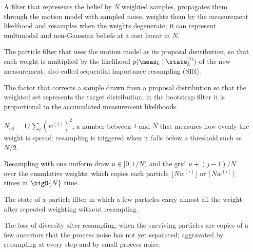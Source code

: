 \item[Particle filter] A filter that represents the belief by $N$ weighted samples, propagates them through the motion model with sampled noise, weights them by the measurement likelihood and resamples when the weights degenerate; it can represent multimodal and non-Gaussian beliefs at a cost linear in $N$.
\item[Bootstrap filter] The particle filter that uses the motion model as its proposal distribution, so that each weight is multiplied by the likelihood $p(\meas_k \mid \state_k^{(i)})$ of the new measurement; also called sequential importance resampling (SIR).
\item[Importance weight] The factor that corrects a sample drawn from a proposal distribution so that the weighted set represents the target distribution; in the bootstrap filter it is proportional to the accumulated measurement likelihoods.
\item[Effective sample size] $N_{\mathrm{eff}} = 1/\sum_i (w^{(i)})^2$, a number between $1$ and $N$ that measures how evenly the weight is spread; resampling is triggered when it falls below a threshold such as $N/2$.
\item[Systematic resampling] Resampling with one uniform draw $u \in [0, 1/N)$ and the grid $u + (j-1)/N$ over the cumulative weights, which copies each particle $\lfloor Nw^{(i)}\rfloor$ or $\lceil Nw^{(i)}\rceil$ times in $\bigO{N}$ time.
\item[Degeneracy] The state of a particle filter in which a few particles carry almost all the weight after repeated weighting without resampling.
\item[Sample impoverishment] The loss of diversity after resampling, when the surviving particles are copies of a few ancestors that the process noise has not yet separated; aggravated by resampling at every step and by small process noise.
